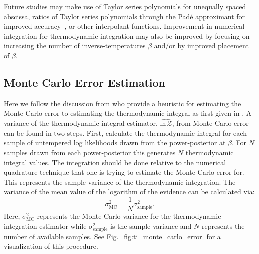 Future studies may make use of Taylor series polynomials for unequally spaced abscissa, ratios of Taylor series polynomials through the Pad$\textrm{\'e}$ approximant for improved accuracy~\citep{press1992pade}, or other interpolant functions. Improvement in numerical integration for thermodynamic integration may also be improved by focusing on increasing the number of inverse-temperatures $\beta$ and/or by improved placement of $\beta$.

\subsection{Monte Carlo Error Estimation}
Here we follow the discussion from \cite{annis2019thermodynamic} who provide a heuristic for estimating the Monte Carlo error to estimating the thermodynamic integral as first given in \cite{friel2008marginal}. A variance of the thermodynamic integral estimator, $\widehat{\mathrm{ln} \, \mathcal{Z}}$, from Monte Carlo error can be found in two steps. First, calculate the thermodynamic integral for each sample of untempered log likelihoods drawn from the power-posterior at $\beta$. For $N$ samples drawn from each power-posterior this generates $N$ thermodynamic integral values. The integration should be done relative to the numerical quadrature technique that one is trying to estimate the Monte-Carlo error for. This represents the sample variance of the thermodynamic integration. The variance of the mean value of the logarithm of the evidence can be calculated via:
\begin{equation}
    \sigma^2_{\mathrm{MC}} = \frac{1}{N} \sigma^2_{\mathrm{sample}}.
\end{equation}
Here, $\sigma^2_{\mathrm{MC}}$ represents the Monte-Carlo variance for the thermodynamic integration estimator while $\sigma^2_{\mathrm{sample}}$ is the sample variance and $N$ represents the number of available samples. See Fig.~\ref{fig:ti_monte_carlo_error} for a visualization of this procedure.

